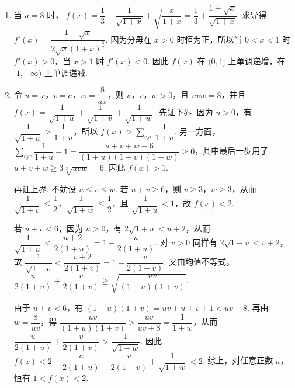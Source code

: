 \begin{solution}
\begin{enumerate}
\item 当 \(a=8\) 时，
\(f(x)=\dfrac{1}{3}+\dfrac{1}{\sqrt{1+x}}+\sqrt{\dfrac{x}{1+x}}=\dfrac{1}{3}+\dfrac{1+\sqrt{x}}{\sqrt{1+x}}\). 求导得
\(f'(x)=\dfrac{1-\sqrt{x}}{2\sqrt{x}(1+x)^{\frac{3}{2}}}\). 因为分母在 \(x>0\) 时恒为正，所以当 \(0<x<1\) 时 \(f'(x)>0\)，当 \(x>1\) 时 \(f'(x)<0\). 因此 \(f(x)\) 在 \((0,1]\) 上单调递增，在 \([1,+\infty)\) 上单调递减.

\item 令 \(u=x\)，\(v=a\)，\(w=\dfrac{8}{ax}\)，则 \(u\)，\(v\)，\(w>0\)，且 \(uvw=8\)，并且
\(f(x)=\dfrac{1}{\sqrt{1+u}}+\dfrac{1}{\sqrt{1+v}}+\dfrac{1}{\sqrt{1+w}}\). 先证下界. 因为 \(u>0\)，有 \(\dfrac{1}{\sqrt{1+u}}>\dfrac{1}{1+u}\)，所以
\(f(x)>\sum\limits_{\mathrm{cyc}}\dfrac{1}{1+u}\). 另一方面，
\(\sum\limits_{\mathrm{cyc}}\dfrac{1}{1+u}-1=\dfrac{u+v+w-6}{(1+u)(1+v)(1+w)}\geqslant0\)，其中最后一步用了 \(u+v+w\geqslant3\sqrt[3]{uvw}=6\). 因此 \(f(x)>1\).

再证上界. 不妨设 \(u\leqslant v\leqslant w\). 若 \(u+v\geqslant6\)，则 \(v\geqslant3\)，\(w\geqslant3\)，从而 \(\dfrac{1}{\sqrt{1+v}}\leqslant\dfrac{1}{2}\)，\(\dfrac{1}{\sqrt{1+w}}\leqslant\dfrac{1}{2}\)，且 \(\dfrac{1}{\sqrt{1+u}}<1\)，故 \(f(x)<2\).

若 \(u+v<6\)，因为 \(u>0\)，有 \(2\sqrt{1+u}<u+2\)，从而
\(\dfrac{1}{\sqrt{1+u}}<\dfrac{u+2}{2(1+u)}=1-\dfrac{u}{2(1+u)}\). 对 \(v>0\) 同样有
\(2\sqrt{1+v}<v+2\)，故
\(\dfrac{1}{\sqrt{1+v}}<\dfrac{v+2}{2(1+v)}=1-\dfrac{v}{2(1+v)}\). 又由均值不等式，
\(\dfrac{u}{2(1+u)}+\dfrac{v}{2(1+v)}\geqslant\sqrt{\dfrac{uv}{(1+u)(1+v)}}\).

由于 \(u+v<6\)，有 \((1+u)(1+v)=uv+u+v+1<uv+8\). 再由 \(w=\dfrac{8}{uv}\)，得
\(\dfrac{uv}{(1+u)(1+v)}>\dfrac{uv}{uv+8}=\dfrac{1}{1+w}\)，从而 \(\dfrac{u}{2(1+u)}+\dfrac{v}{2(1+v)}>\dfrac{1}{\sqrt{1+w}}\). 因此
\(f(x)<2-\dfrac{u}{2(1+u)}-\dfrac{v}{2(1+v)}+\dfrac{1}{\sqrt{1+w}}<2\). 综上，对任意正数 \(a\)，恒有 \(1<f(x)<2\).
\end{enumerate}
\end{solution}
